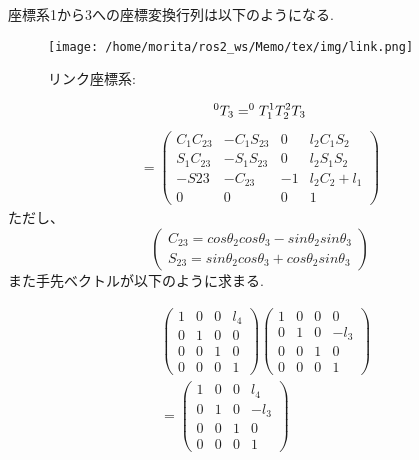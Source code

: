 \documentclass[10pt]{jarticle}
\begin{document}
	座標系1から3への座標変換行列は以下のようになる.
    \begin{center}
        \begin{figure}[h]
            \texttt{[image: /home/morita/ros2\_ws/Memo/tex/img/link.png]}
            \caption{リンク座標系:}
            \label{fig:sample-fig}
        \end{figure}
    \end{center}
$$
	^{0}T_{3}=^{0}T_{1} ^{1}T_{2} ^{2}T_{3} \\
$$
	\begin{equation*}
		\begin{array}{cc}
			=
			\left( 
				\begin{array}{cccc}
					C_1C_{23} & -C_1S_{23} & 0 & l_2C_1S_2 \\
					S_1C_{23} & -S_1S_{23} & 0 & l_2S_1S_2 \\
					-S{23} & -C_{23} & -1 & l_2C_2 + l_1 \\
					0 & 0 & 0 & 1 
				\end{array}
			\right)
		\end{array}
	\end{equation*}
	ただし、
	\begin{equation*}
		\left(
		\begin{split}
			C_{23} = cos\theta_2cos\theta_3-sin\theta_2sin\theta_3\\
			S_{23} = sin\theta_2cos\theta_3+cos\theta_2sin\theta_3	
		\end{split}
		\right)
	\end{equation*}
    また手先ベクトルが以下のように求まる.

	\begin{equation*}
	\begin{array}{cccc}
		&\left(
			\begin{array}{cccc}
				1 & 0 & 0 & l_4\\
				0 & 1 & 0 & 0\\
				0 & 0 & 1 & 0\\
				0 & 0 & 0 & 1
			\end{array}
		\right)
		\left(
			\begin{array}{cccc}
				1 & 0 & 0 & 0\\
				0 & 1 & 0 & -l_3\\
				0 & 0 & 1 & 0\\
				0 & 0 & 0 & 1
			\end{array}
			\right)\\
		&=
		\left(
		\begin{array}{cccc}
			1 & 0 & 0 & l_4\\
			0 & 1 & 0 & -l_3\\
			0 & 0 & 1 & 0\\
			0 & 0 & 0 & 1
		\end{array}
		\right)
	\end{array}
	\end{equation*}
	
\end{document}
